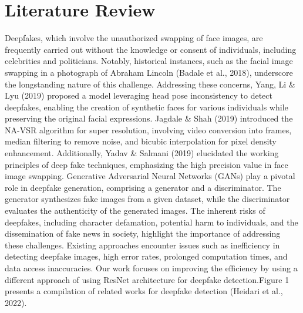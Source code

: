 \chapter{Literature Review}
Deepfakes, which involve the unauthorized swapping of face images, are frequently carried out without the knowledge or consent of individuals, including celebrities and politicians. Notably, historical instances, such as the facial image swapping in a photograph of Abraham Lincoln (Badale et al., 2018), underscore the longstanding nature of this challenge. Addressing these concerns, Yang, Li \& Lyu (2019) proposed a model leveraging head pose inconsistency to detect deepfakes, enabling the creation of synthetic faces for various individuals while preserving the original facial expressions.
Jagdale \& Shah (2019) introduced the NA-VSR algorithm for super resolution, involving video conversion into frames, median filtering to remove noise, and bicubic interpolation for pixel density enhancement. Additionally, Yadav \& Salmani (2019) elucidated the working principles of deep fake techniques, emphasizing the high precision value in face image swapping.
Generative Adversarial Neural Networks (GANs) play a pivotal role in deepfake generation, comprising a generator and a discriminator. The generator synthesizes fake images from a given dataset, while the discriminator evaluates the authenticity of the generated images. The inherent risks of deepfakes, including character defamation, potential harm to individuals, and the dissemination of fake news in society, highlight the importance of addressing these challenges.
Existing approaches encounter issues such as inefficiency in detecting deepfake images, high error rates, prolonged computation times, and data access inaccuracies. Our work focuses on improving the efficiency by using a different approach of using ResNet architecture for deepfake detection.Figure 1 presents a compilation of related works for deepfake detection (Heidari et al., 2022).

